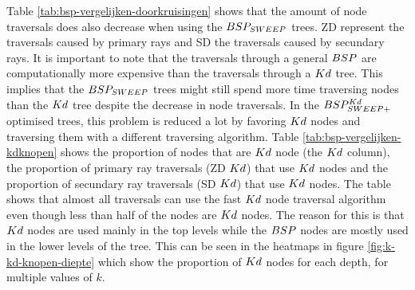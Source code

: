 Table \ref{tab:bsp-vergelijken-doorkruisingen} shows that the amount of node traversals does also decrease when using the $BSP_{SWEEP}$ trees. ZD represent the traversals caused by primary rays and SD the traversals caused by secundary rays.
It is important to note that the traversals through a general $BSP$ are computationally more expensive than the traversals through a $Kd$ tree. This implies that the $BSP_{SWEEP}$ trees might still spend more time traversing nodes than the $Kd$ tree despite the decrease in node traversals.
In the $BSP^{Kd}_{SWEEP+}$ optimised trees, this problem is reduced a lot by favoring $Kd$ nodes and traversing them with a different traversing algorithm. Table \ref{tab:bsp-vergelijken-kdknopen} shows the proportion of nodes that are $Kd$ node (the $Kd$ column), the proportion of primary ray traversals (ZD $Kd$) that use $Kd$ nodes and the proportion of secundary ray traversals (SD $Kd$) that use $Kd$ nodes. The table shows that almost all traversals can use the fast $Kd$ node traversal algorithm even though less than half of the nodes are $Kd$ nodes. The reason for this is that $Kd$ nodes are used mainly in the top levels while the $BSP$ nodes are mostly used in the lower levels of the tree. This can be seen in the heatmaps in figure \ref{fig:k-kd-knopen-diepte} which show the proportion of $Kd$ nodes for each depth, for multiple values of $k$. 
\\


